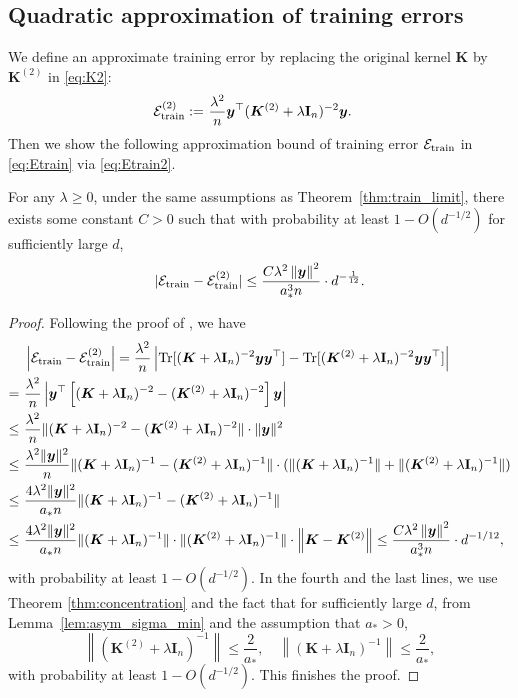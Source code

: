 \documentclass[twoside,11pt]{article}
\newcommand{\norm}[1]{\left\|#1\right\|}
\newcommand{\by}{\boldsymbol{y}}
\def\bI{{\mathbf I}}
\def\bK{{\boldsymbol K}}
\def\by{{\boldsymbol y}}
\def\cE{{\mathcal E}}
\renewcommand{\bK}{\boldsymbol{K}}
\newcommand{\Etrain}{\cE_{\textnormal{train}}}
\newcommand{\Tr}{\operatorname{Tr}}
\newcommand{\1}{\mathbf{1}}
\def\mbi#1{\boldsymbol{#1}}
\def\v#1{\mbi{#1}} %
\def\mbi#1{\boldsymbol{#1}} %
\begin{document}
\subsection{Quadratic approximation of training errors}
We define an approximate training error by replacing the original kernel $\bK$ by $\bK^{(2)}$ in \eqref{eq:K2}:
\begin{align}\label{eq:Etrain2}
   \Etrain^{(2)}:=~&    \frac{\lambda^2}{n}\by^\top(\bK^{(2)} +\lambda\bI_n)^{-2} \by.
\end{align}
Then we show the following approximation bound of training error $\Etrain$ in \eqref{eq:Etrain} via \eqref{eq:Etrain2}.
\begin{lemma}\label{lemm:approx_train}
For any $\lambda\geq 0$, under the same assumptions as Theorem~\ref{thm:train_limit}, there exists some constant $C>0$ such that with probability at least $1-O(d^{-1/2})$ for sufficiently large $d$,
    \[
        |\Etrain -\Etrain^{(2)}|\le\frac{C\lambda^2\norm{\by}^2}{a_*^3 n} \cdot d^{-\frac{1}{12}}.
   \]
\end{lemma}
\begin{proof}
    Following the proof of \cite[Theorem 2.7]{wang2023overparameterized}, we have 
\begin{align}
     &\left| \Etrain -\Etrain^{(2)}\right|= \frac{\lambda^2}{n} \left|\Tr[(\bK+\lambda\bI_n)^{-2} \v y\v y^\top]-\Tr[(\bK^{(2)} +\lambda\bI_n)^{-2} \v y\v y^\top] \right| \notag \\
     =~& \frac{\lambda^2}{n} \left|\v y^\top\left[(\bK +\lambda\bI_n)^{-2}-(\bK^{(2)} +\lambda\bI_n)^{-2}\right] \v y\right| \notag \\
     \leq ~&\frac{\lambda^2}{n} \|(\bK +\lambda\bI_n)^{-2}-(\bK^{(2)} +\lambda\bI_n)^{-2}\|\cdot  \|\v y\|^2 \notag\\
     \leq ~& \frac{\lambda^2\|\v y\|^2}{n} \|(\bK +\lambda\bI_n)^{-1}-(\bK^{(2)}+\lambda\bI_n)^{-1}\|\cdot(\|(\bK +\lambda\bI_n)^{-1}\|+\|(\bK^{(2)} +\lambda\bI_n)^{-1}\|) \notag\\
     \leq ~&\frac{4\lambda^2\|\v y\|^2}{ a_* n} \| (\bK +\lambda\bI_n)^{-1}-(\bK^{(2)} +\lambda\bI_n)^{-1} \| 
 \notag\\
     \leq ~& \frac{4\lambda^2\|\v y\|^2}{ a_* n} \| (\bK +\lambda\bI_n)^{-1}\|\cdot\|(\bK^{(2)} +\lambda\bI_n)^{-1} \|\cdot\norm{\bK-\bK^{(2)}}
     \leq \frac{C\lambda^2\norm{\by}^2}{a_*^3 n} \cdot d^{-1/12}, \notag
\end{align}
with probability at least $1-O(d^{-1/2})$. In the fourth and the last lines, we use Theorem \ref{thm:concentration} and  the fact that for sufficiently large $d$, from Lemma~\ref{lem:asym_sigma_min} and the assumption that $a_*>0$,
\begin{equation}\label{eq:K_lambda_-1}
    \norm{(\bK^{(2)} +\lambda\bI_n)^{-1}}\leq  \frac{2}{a_*}, \quad  \norm{(\bK +\lambda\bI_n)^{-1}} \leq \frac{2}{a_*},
\end{equation}with probability at least $1-O(d^{-1/2})$.
This finishes the proof.
\end{proof}
\end{document}
